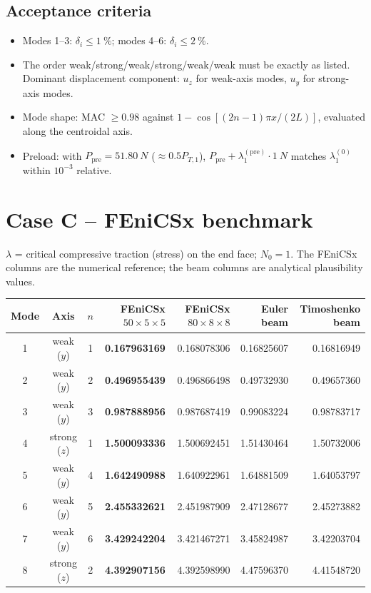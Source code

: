 \documentclass[11pt,a4paper]{report}
\newcommand{\refval}[1]{\textbf{#1}}
\begin{document}
\subsection*{Acceptance criteria}
\begin{itemize}
\item Modes 1--3: $\delta_i\le\SI{1}{\percent}$; modes 4--6:
  $\delta_i\le\SI{2}{\percent}$.
\item The order weak/strong/weak/strong/weak/weak must be exactly as listed.
  Dominant displacement component: $u_z$ for weak-axis modes, $u_y$ for
  strong-axis modes.
\item Mode shape: MAC $\ge 0.98$ against $1-\cos[(2n-1)\pi x/(2L)]$,
  evaluated along the centroidal axis.
\item Preload: with $P_\text{pre}=\SI{51.80}{N}$ ($\approx0.5P_{T,1}$),
  $P_\text{pre}+\lambda_1^{(\text{pre})}\cdot\SI{1}{N}$ matches
  $\lambda_1^{(0)}$ within $10^{-3}$ relative.
\end{itemize}

\section{Case C -- FEniCSx benchmark}
$\lambda$ = critical compressive traction (stress) on the end face; $N_0=1$.
The FEniCSx columns are the numerical reference; the beam columns are
analytical plausibility values.

\begin{center}
\small
\begin{tabular}{@{}cc c r r r r@{}}
\toprule
Mode & Axis & $n$ & \refval{FEniCSx $50{\times}5{\times}5$} & FEniCSx $80{\times}8{\times}8$ & Euler beam & Timoshenko beam \\
\midrule
1 & weak ($y$) & 1 & \refval{0.167963169} & 0.168078306 & 0.16825607 & 0.16816949 \\
2 & weak ($y$) & 2 & \refval{0.496955439} & 0.496866498 & 0.49732930 & 0.49657360 \\
3 & weak ($y$) & 3 & \refval{0.987888956} & 0.987687419 & 0.99083224 & 0.98783717 \\
4 & strong ($z$) & 1 & \refval{1.500093336} & 1.500692451 & 1.51430464 & 1.50732006 \\
5 & weak ($y$) & 4 & \refval{1.642490988} & 1.640922961 & 1.64881509 & 1.64053797 \\
6 & weak ($y$) & 5 & \refval{2.455332621} & 2.451987909 & 2.47128677 & 2.45273882 \\
7 & weak ($y$) & 6 & \refval{3.429242204} & 3.421467271 & 3.45824987 & 3.42203704 \\
8 & strong ($z$) & 2 & \refval{4.392907156} & 4.392598990 & 4.47596370 & 4.41548720 \\
\bottomrule
\end{tabular}
\end{center}
\end{document}
